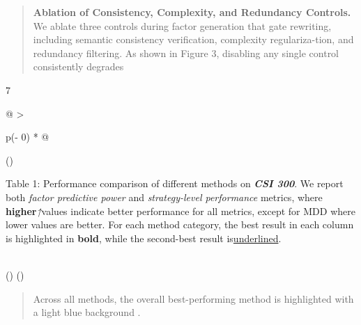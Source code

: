 \documentclass[
]{article}
\begin{document}
\begin{quote}
\textbf{Ablation of Consistency, Complexity, and Redundancy Controls.}
We ablate three controls during factor generation that gate rewriting,
including semantic consistency verification, complexity regulariza-tion,
and redundancy filtering. As shown in Figure 3, disabling any single
control consistently degrades
\end{quote}

7

\begin{longtable}[]{@{}
  >{\raggedright\arraybackslash}p{(\columnwidth - 0\tabcolsep) * }@{}}
\toprule()
\begin{minipage}[b]{\linewidth}\raggedright
Table 1: Performance comparison of different methods on
\emph{\textbf{CSI 300}}. We report both \emph{factor predictive power}
and \emph{strategy-level performance} metrics, where
\textbf{higher}\emph{↑}values indicate better performance for all
metrics, except for MDD where lower values are better. For each method
category, the best result in each column is highlighted in
\textbf{bold}, while the second-best result is\uline{underlined}.
\end{minipage} \\
\midrule()
\endhead
\bottomrule()
\end{longtable}

\begin{quote}
Across all methods, the overall best-performing method is highlighted
with a light blue background .
\end{quote}
\end{document}

